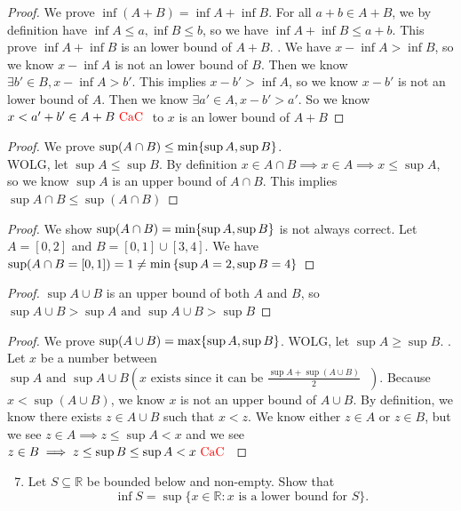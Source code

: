 \documentclass{report}
\begin{document}
\begin{proof}
We prove $\inf (A+B)= \inf A +\inf B$. For all $a+b \in A+B$, we by definition have $\inf A\leq a,\inf B\leq b$, so we have $\inf A+\inf B\leq a+b$. This prove $\inf A+ \inf B$ is an lower bound of $A+B$.  . We have $x- \inf A > \inf B$, so we know $x - \inf A$ is not an lower bound of $B$. Then we know  $\exists b' \in B, x- \inf A > b'$. This implies $x-b'>\inf A$, so we know $x- b'$ is not an lower bound of $A$. Then we know  $\exists a' \in A, x-b'>a'$. So we know $x<a'+b' \in A+B\text{ \textcolor{red}{CaC} }$ to $x$ is an lower bound of $A+B$ 
\end{proof}
\begin{proof}
We prove $\sup (A\cap B)\leq \min \{ \sup A,\sup  B \}$.\\

WOLG, let $\sup A\leq \sup B$. By definition $x \in A\cap B \implies  x \in A \implies x\leq \sup A$, so we know $\sup A$ is an upper bound of $A\cap B$. This implies $\sup A\cap B\leq \sup (A\cap B)$ 
\end{proof}
\begin{proof}
We show $\sup (A\cap B)= \min \{ \sup A,\sup B \}$ is not always correct. Let $A=[0,2]$ and $B=[0,1]\cup [3,4]$. We have $\sup (A\cap B= [0,1])=1\neq \min{\{ \sup A=2,\sup B=4 \}}$
\end{proof}
\begin{proof}
$\sup A\cup B$ is an upper bound of both $A$ and  $B$, so  $\sup A\cup B>\sup A\text{ and }\sup A\cup B>\sup B$

\end{proof}
\begin{proof}
We prove $\sup (A\cup B)=\max \{ \sup A,\sup B \}$. WOLG, let $\sup A\geq \sup B$. . Let $x$ be a number between  $\sup A\text{ and }\sup A\cup B(x\text{ exists since it can be $\frac{\sup A+\sup (A\cup B)}{2}$ })$. Because $x<\sup (A\cup B)$, we know $x$ is not an upper bound of  $A\cup B$. By definition, we know there exists $z\in A\cup B$ such that $x<z$. We know either $z \in A$ or $z \in B$, but we see $z \in A\implies z\leq \sup A<x$ and we see $z \in B\implies z\leq \sup B\leq \sup A<x\text{ \textcolor{red}{CaC} }$
\end{proof}
\begin{question}{}{}
\begin{enumerate}
    \setcounter{enumi}{6}
    \item Let \( S \subseteq \mathbb{R} \) be bounded below and non-empty. Show that
    \[ \inf S = \sup\{ x \in \mathbb{R} : x \text{ is a lower bound for } S \}. \]
\end{enumerate}
\end{question}
\end{document}
